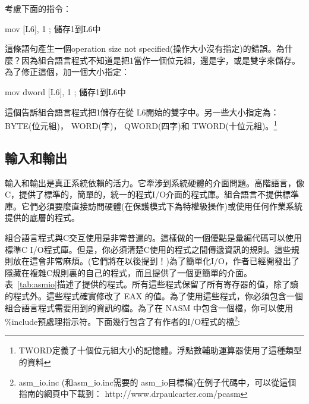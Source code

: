 考慮下面的指令：
\begin{AsmCodeListing}[frame=none, numbers=none]
      mov    [L6], 1             ; 儲存1到L6中
\end{AsmCodeListing}
這條語句產生一個{\code operation size not
specified}(操作大小沒有指定)的錯誤。為什麼？因為組合語言程式不知道是把1當作一個位元組，還是字，或是雙字來儲存。為了修正這個，加一個大小指定：
\begin{AsmCodeListing}[frame=none, numbers=none]
      mov    dword [L6], 1       ; 儲存1到L6中
\end{AsmCodeListing}
這個告訴組合語言程式把1儲存在從{\code
L6}開始的雙字中。另一些大小指定為： {\code BYTE}(位元組)，
{\code WORD}(字)， {\code QWORD}(四字)和{\code
TWORD}(十位元組)。\footnote{{\code
TWORD}定義了十個位元組大小的記憶體。浮點數輔助運算器使用了這種類型的資料}

\subsection{輸入和輸出 }

輸入和輸出是真正系統依賴的活力。它牽涉到系統硬體的介面問題。高階語言，像C，提供了標準的，簡單的，統一的程式I/O介面的程式庫。組合語言不提供標準庫。它們必須要麼直接訪問硬體(在保護模式下為特權級操作)或使用任何作業系統提供的底層的程式。

組合語言程式與C交互使用是非常普遍的。這樣做的一個優點是彙編代碼可以使用標準C
I/O程式庫。但是，你必須清楚C使用的程式之間傳遞資訊的規則。這些規則放在這會非常麻煩。(它們將在以後提到！)為了簡單化I/O，作者已經開發出了隱藏在複雜C規則裏的自己的程式，而且提供了一個更簡單的介面。表~\ref{tab:asmio}描述了提供的程式。所有這些程式保留了所有寄存器的值，除了讀的程式外。這些程式確實修改了
EAX
的值。為了使用這些程式，你必須包含一個組合語言程式需要用到的資訊的檔。為了在
NASM 中包含一個檔，你可以使用{\code
\%include}預處理指示符。下面幾行包含了有作者的I/O程式的檔\footnote{
{\code asm\_io.inc} (和{\code asm\_io.inc}需要的{\code
asm\_io}目標檔)在例子代碼中，可以從這個指南的網頁中下載到：{\code
http://www.drpaulcarter.com/pcasm}}:
\begin{AsmCodeListing}[frame=none, numbers=none]
\end{AsmCodeListing}

